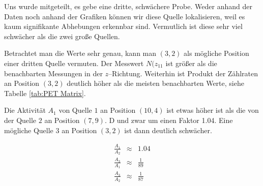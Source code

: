 \documentclass[12pt,a4paper]{scrartcl}
\numberwithin{equation}{section} %
\begin{document}
Uns wurde mitgeteilt, es gebe eine dritte, schwächere Probe. Weder anhand der Daten noch anhand der Grafiken können wir diese Quelle lokalisieren, weil es kaum signifikante Abhebungen erkennbar sind. Vermutlich ist diese sehr viel schwächer als die zwei große Quellen.

Betrachtet man die Werte sehr genau, kann man $(3,2)$ als mögliche Position einer dritten Quelle vermuten. Der Messwert $N(z_{11}$ ist größer als die benachbarten Messungen in der $z$--Richtung. Weiterhin ist Produkt der Zählraten an Position $(3,2)$ deutlich höher als die meisten benachbarten Werte, siehe Tabelle \ref{tab:PET Matrix}.

Die Aktivität $A_1$ von Quelle $1$ an Position $(10,4)$ ist etwas höher ist als die von der Quelle $2$ an Position $(7,9)$. D und zwar um einen Faktor 1.04. Eine mögliche Quelle $3$ an Position $(3,2)$ ist dann deutlich schwächer.

\begin{eqnarray}
	\frac{A_1}{A_2} &\approx& 1.04 \\
	\frac{A_3}{A_1} &\approx& \frac{1}{89} \\
	\frac{A_3}{A_2} &\approx& \frac{1}{87}
\end{eqnarray}
\end{document}
